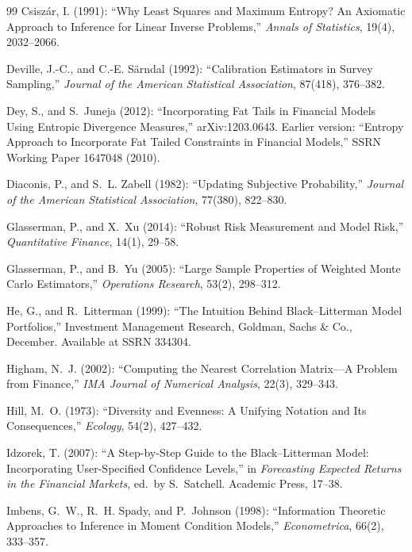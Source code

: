 \documentclass[11pt]{article}
\begin{document}
\begin{thebibliography}{99}
Csisz\'ar, I. (1991): ``Why Least Squares and Maximum Entropy? An Axiomatic
Approach to Inference for Linear Inverse Problems,'' \textit{Annals of
Statistics}, 19(4), 2032--2066.

Deville, J.-C., and C.-E. S\"arndal (1992): ``Calibration Estimators in
Survey Sampling,'' \textit{Journal of the American Statistical
Association}, 87(418), 376--382.

Dey, S., and S.~Juneja (2012): ``Incorporating Fat Tails in Financial Models
Using Entropic Divergence Measures,'' arXiv:1203.0643. Earlier version:
``Entropy Approach to Incorporate Fat Tailed Constraints in Financial
Models,'' SSRN Working Paper 1647048 (2010).

Diaconis, P., and S.~L. Zabell (1982): ``Updating Subjective
Probability,'' \textit{Journal of the American Statistical Association},
77(380), 822--830.

Glasserman, P., and X.~Xu (2014): ``Robust Risk Measurement and Model Risk,''
\textit{Quantitative Finance}, 14(1), 29--58.

Glasserman, P., and B.~Yu (2005): ``Large Sample Properties of Weighted Monte
Carlo Estimators,'' \textit{Operations Research}, 53(2), 298--312.

He, G., and R.~Litterman (1999): ``The Intuition Behind Black--Litterman
Model Portfolios,'' Investment Management Research, Goldman, Sachs \& Co.,
December. Available at SSRN 334304.

Higham, N.~J. (2002): ``Computing the Nearest Correlation Matrix---A
Problem from Finance,'' \textit{IMA Journal of Numerical Analysis}, 22(3),
329--343.

Hill, M.~O. (1973): ``Diversity and Evenness: A Unifying Notation and Its
Consequences,'' \textit{Ecology}, 54(2), 427--432.

Idzorek, T. (2007): ``A Step-by-Step Guide to the Black--Litterman Model: Incorporating
User-Specified Confidence Levels,''
in \textit{Forecasting Expected Returns in the Financial Markets}, ed.\ by
S.~Satchell. Academic Press, 17--38.

Imbens, G.~W., R.~H. Spady, and P.~Johnson (1998): ``Information Theoretic
Approaches to Inference in Moment Condition Models,'' \textit{Econometrica},
66(2), 333--357.


\end{thebibliography}
\end{document}
